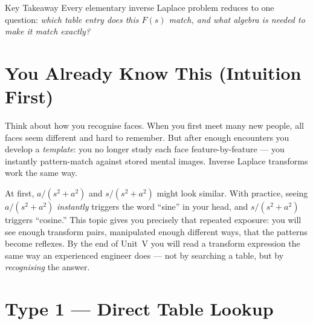 \documentclass[12pt,a4paper]{article}
\begin{document}
\begin{learnbox}{Key Takeaway}
Every elementary inverse Laplace problem reduces to one question: \emph{which table entry
does this $F(s)$ match, and what algebra is needed to make it match exactly?}
\end{learnbox}

\section{You Already Know This (Intuition First)}

Think about how you recognise faces. When you first meet many new people, all faces seem
different and hard to remember. But after enough encounters you develop a \emph{template}:
you no longer study each face feature-by-feature --- you instantly pattern-match against
stored mental images. Inverse Laplace transforms work the same way.

At first, $a/(s^2+a^2)$ and $s/(s^2+a^2)$ might look similar. With practice, seeing
$a/(s^2+a^2)$ \emph{instantly} triggers the word ``sine'' in your head, and $s/(s^2+a^2)$
triggers ``cosine.'' This topic gives you precisely that repeated exposure: you will see
enough transform pairs, manipulated enough different ways, that the patterns become reflexes.
By the end of Unit~V you will read a transform expression the same way an experienced
engineer does --- not by searching a table, but by \emph{recognising} the answer.

\section{Type 1 --- Direct Table Lookup}
\end{document}

